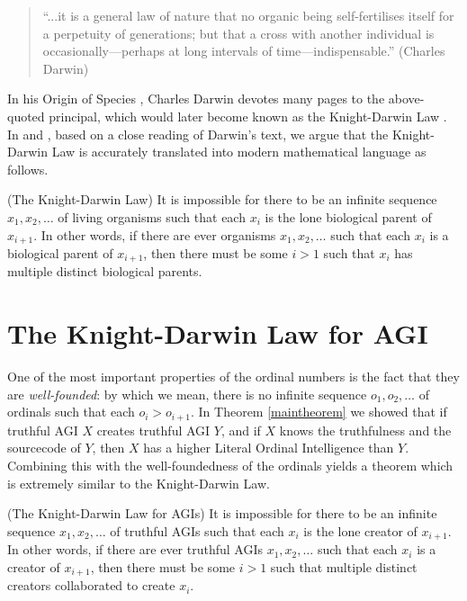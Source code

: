 \documentclass[runningheads]{llncs}
\begin{document}
\begin{quote}
``...it is a general law of nature that no organic being self-fertilises itself
for a perpetuity of generations; but that a cross with another individual
is occasionally---perhaps at long intervals of time---indispensable.''
(Charles Darwin)
\end{quote}

In his Origin of Species \cite{originofspecies}, Charles Darwin devotes many
pages to the above-quoted principal, which would later become known as the
Knight-Darwin Law \cite{darwin1898knight}. In \cite{alexander2013} and
\cite{alexander2015}, based on a close reading of Darwin's text, we argue
that the Knight-Darwin Law is accurately translated into modern mathematical
language as follows.

\begin{principle}
(The Knight-Darwin Law)
It is impossible for there to be an infinite sequence
$x_1,x_2,\ldots$ of living organisms such that each $x_i$
is the lone biological parent of $x_{i+1}$. In other words,
if there are ever organisms $x_1,x_2,\ldots$ such that each
$x_i$ is a biological parent of $x_{i+1}$, then there must
be some $i>1$ such that $x_i$ has multiple distinct biological
parents.
\end{principle}


\section{The Knight-Darwin Law for AGI}
\label{knightdarwinagisection}

One of the most important properties of the ordinal numbers is the
fact that they are \emph{well-founded}: by which we mean, there is
no infinite sequence $o_1,o_2,\ldots$ of ordinals such that each
$o_i>o_{i+1}$. In Theorem \ref{maintheorem} we showed that if truthful
AGI $X$ creates truthful AGI $Y$, and if $X$ knows the truthfulness
and the sourcecode of $Y$, then $X$ has a higher Literal Ordinal Intelligence
than $Y$. Combining this with the well-foundedness of the ordinals yields
a theorem which is extremely similar to the Knight-Darwin Law.

\begin{theorem}
\label{maintheorem2}
(The Knight-Darwin Law for AGIs)
It is impossible for there to be an infinite sequence
$x_1,x_2,\ldots$ of truthful AGIs such that each $x_i$ is the lone creator of $x_{i+1}$.
In other words, if there are
ever truthful AGIs $x_1,x_2,\ldots$ such that each $x_i$ is a creator of $x_{i+1}$,
then there must be some $i>1$ such that multiple distinct creators collaborated to
create $x_i$.
\end{theorem}
\end{document}
